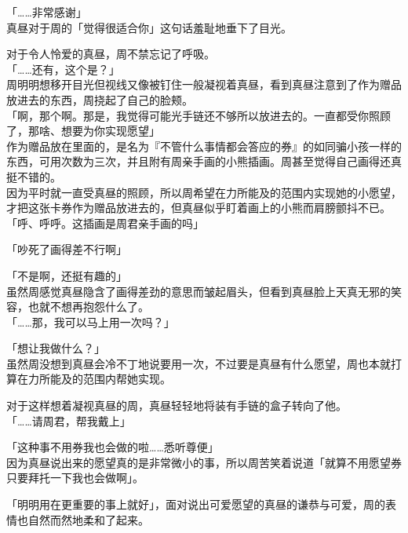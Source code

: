 「……非常感谢」\\

真昼对于周的「觉得很适合你」这句话羞耻地垂下了目光。

对于令人怜爱的真昼，周不禁忘记了呼吸。\\

「……还有，这个是？」\\

周明明想移开目光但视线又像被钉住一般凝视着真昼，看到真昼注意到了作为赠品放进去的东西，周挠起了自己的脸颊。\\

「啊，那个啊。那是，我觉得可能光手链还不够所以放进去的。一直都受你照顾了，那啥、想要为你实现愿望」\\

作为赠品放在里面的，是名为『不管什么事情都会答应的券』的如同骗小孩一样的东西，可用次数为三次，并且附有周亲手画的小熊插画。周甚至觉得自己画得还真挺不错的。\\

因为平时就一直受真昼的照顾，所以周希望在力所能及的范围内实现她的小愿望，才把这张卡券作为赠品放进去的，但真昼似乎盯着画上的小熊而肩膀颤抖不已。\\

「呼、呼呼。这插画是周君亲手画的吗」

「吵死了画得差不行啊」

「不是啊，还挺有趣的」\\

虽然周感觉真昼隐含了画得差劲的意思而皱起眉头，但看到真昼脸上天真无邪的笑容，也就不想再抱怨什么了。\\

「……那，我可以马上用一次吗？」

「想让我做什么？」\\

虽然周没想到真昼会冷不丁地说要用一次，不过要是真昼有什么愿望，周也本就打算在力所能及的范围内帮她实现。

对于这样想着凝视真昼的周，真昼轻轻地将装有手链的盒子转向了他。\\

「……请周君，帮我戴上」

「这种事不用券我也会做的啦……悉听尊便」\\

因为真昼说出来的愿望真的是非常微小的事，所以周苦笑着说道「就算不用愿望券只要拜托一下我也会做啊」。

「明明用在更重要的事上就好」，面对说出可爱愿望的真昼的谦恭与可爱，周的表情也自然而然地柔和了起来。\\

